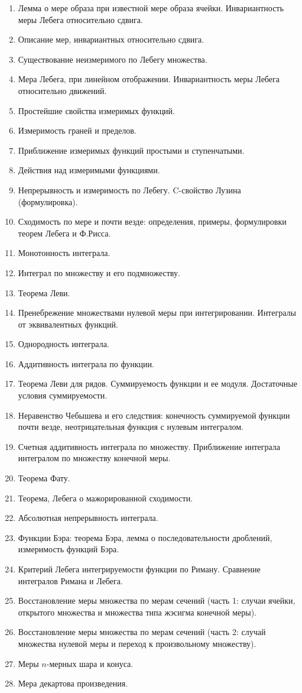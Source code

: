 \documentclass[12pt, a4paper]{book}
\begin{document}
\begin{enumerate}
\item Лемма о мере образа при известной мере образа ячейки. Инвариантность меры Лебега относительно сдвига.
\item Описание мер, инвариантных относительно сдвига.
\item Существование неизмеримого по Лебегу множества.
\item Мера Лебега, при линейном отображении. Инвариантность меры Лебега относительно движений.
\item Простейшие свойства измеримых функций.
\item Измеримость граней и пределов.
\item Приближение измеримых функций простыми и ступенчатыми.
\item Действия над измеримыми функциями.
\item Непрерывность и измеримость по Лебегу. C-свойство Лузина (формулировка).
\item Сходимость по мере и почти везде: определения, примеры, формулировки теорем Лебега и Ф.Рисса.
\item Монотонность интеграла.
\item Интеграл по множеству и его подмножеству.
\item Теорема Леви.
\item Пренебрежение множествами нулевой меры при интегрировании. Интегралы от эквивалентных функций.
\item Однородность интеграла.
\item Аддитивность интеграла по функции.
\item Теорема Леви для рядов. Суммируемость функции и ее модуля. Достаточные условия суммируемости.
\item Неравенство Чебышева и его следствия: конечность суммируемой функции почти везде, неотрицательная функция с нулевым интегралом.
\item Счетная аддитивность интеграла по множеству. Приближение интеграла интегралом по множеству конечной меры.
\item Теорема Фату.
\item Теорема, Лебега о мажорированной сходимости.
\item Абсолютная непрерывность интеграла.
\item Функции Бэра: теорема Бэра, лемма о последовательности дроблений, измеримость функций Бэра.
\item Критерий Лебега интегрируемости функции по Риману. Сравнение интегралов Римана и Лебега.
\item Восстановление меры множества по мерам сечений (часть 1: случаи ячейки, открытого множества и множества типа жэсигма конечной меры).
\item Восстановление меры множества по мерам сечений (часть 2: случай множества нулевой меры и переход к произвольному множеству).
\item Меры $n$-мерных шара и конуса.
\item Мера декартова произведения.
\end{enumerate}
\end{document}
